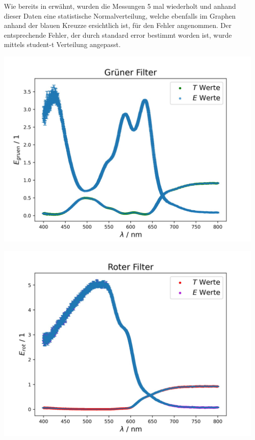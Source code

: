 \documentclass[11pt,ngerman]{scrartcl}
\begin{document}
\vspace{2mm}

\noindent Wie bereits in  erwähnt, wurden die
Messungen 5 mal wiederholt und anhand dieser Daten eine statistische
Normalverteilung, welche ebenfalls im Graphen anhand der blauen Kreuzze
ersichtlich ist, für den Fehler angenommen. Der entsprechende Fehler, der durch
standard error bestimmt worden ist, wurde mittels student-t Verteilung
angepasst.



\begin{center}
	\begin{minipage}{0.65\textwidth}
		\includegraphics[width=\textwidth]{gruen_f}
		\label{fig:gruen_f}
	\end{minipage}
\end{center}

\begin{center}
	\begin{minipage}{0.65\textwidth}
		\includegraphics[width=\textwidth]{rot}
		\label{fig:rot}
	\end{minipage}
\end{center}
\end{document}
